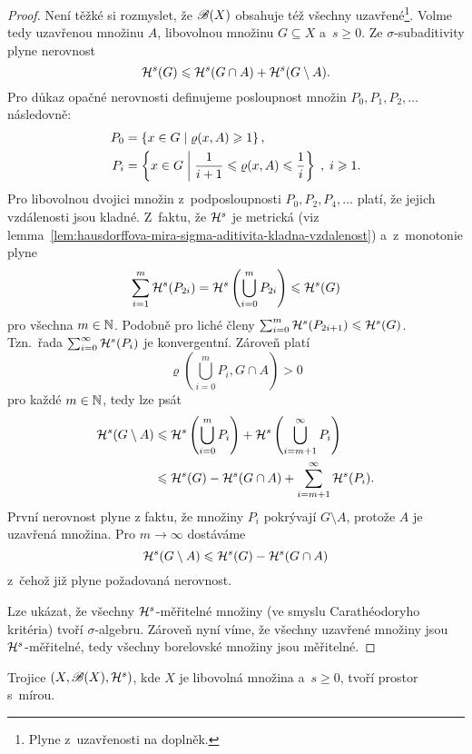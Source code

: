 \begin{proof}
    Není těžké si rozmyslet, že $\mathscr{B}(X)$ obsahuje též všechny uzavřené\footnote{Plyne z~uzavřenosti na doplněk.}. Volme tedy uzavřenou množinu $A$, libovolnou množinu $G\subseteq X$ a~$s\geqslant 0$. Ze $\sigma$-subaditivity plyne nerovnost
    \[\mathcal{H}^{s}(G)\leqslant\mathcal{H}^{s}(G\cap A)+\mathcal{H}^{s}(G\setminus A).\]
    Pro důkaz opačné nerovnosti definujeme posloupnost množin $P_0,P_1,P_2,\ldots$ následovně:
    \begin{align*}
        P_0&=\left\{x\in G\mid\varrho(x,A)\geqslant 1\right\},\\
        P_i&=\left\{x\in G\;\middle|\;\dfrac{1}{i+1}\leqslant\varrho(x,A)\leqslant\dfrac{1}{i}\right\}\;,\;i\geqslant 1.
    \end{align*}
    Pro libovolnou dvojici množin z~podposloupnosti $P_0,P_2,P_4,\ldots$ platí, že jejich vzdálenosti jsou kladné. Z~faktu, že $\mathcal{H}^{s}$ je metrická (viz lemma~\ref{lem:hausdorffova-mira-sigma-aditivita-kladna-vzdalenost}) a~z~monotonie plyne
    \[\sum_{i=1}^{m}\mathcal{H}^{s}(P_{2i})=\mathcal{H}^{s}\left(\bigcup_{i=0}^m P_{2i}\right)\leqslant\mathcal{H}^{s}(G)\]
    pro všechna $m\in\mathbb{N}$. Podobně pro liché členy $\sum_{i=0}^{m}\mathcal{H}^{s}(P_{2i+1})\leqslant\mathcal{H}^{s}(G)$. Tzn.~řada $\sum_{i=0}^{\infty}\mathcal{H}^{s}(P_i)$ je konvergentní. Zároveň platí
    \[\varrho\left(\bigcup_{i=0}^m P_i,G\cap A\right)>0\]
    pro každé $m\in\mathbb{N}$, tedy lze psát
    \begin{align*}
        \mathcal{H}^{s}(G\setminus A)&\leqslant\mathcal{H}^{s}\left(\bigcup_{i=0}^m P_i\right)+\mathcal{H}^{s}\left(\bigcup_{i=m+1}^\infty P_i\right)\\
        &\leqslant\mathcal{H}^{s}(G)-\mathcal{H}^{s}(G\cap A)+\sum_{i=m+1}^{\infty}\mathcal{H}^{s}(P_i).
    \end{align*}
    První nerovnost plyne z faktu, že množiny $P_i$ pokrývají $G\setminus A$, protože $A$ je uzavřená množina. Pro $m\to\infty$ dostáváme
    \[\mathcal{H}^{s}(G\setminus A)\leqslant\mathcal{H}^{s}(G)-\mathcal{H}^{s}(G\cap A)\]
    z~čehož již plyne požadovaná nerovnost.

    Lze ukázat, že všechny $\mathcal{H}^{s}$-měřitelné množiny (ve smyslu Carathéodoryho kritéria) tvoří $\sigma$-algebru. Zároveň nyní víme, že všechny uzavřené množiny jsou $\mathcal{H}^{s}$-měřitelné, tedy všechny borelovské množiny jsou měřitelné. 
\end{proof}
\begin{corollary}\label{cor:hausdorffova-mira-je-mira}
    Trojice $(X,\mathscr{B}(X),\mathcal{H}^{s})$, kde $X$ je libovolná množina a~$s\geqslant 0$, tvoří prostor s~mírou.
\end{corollary}

